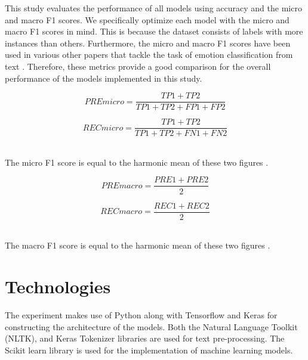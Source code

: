 This study evaluates the performance of all models using accuracy and the micro and macro F1 scores. We specifically optimize each model with the micro and macro F1 scores in mind. This is because the dataset consists of labels with more instances than others. Furthermore, the micro and macro F1 scores have been used in various other papers that tackle the task of emotion classification from text \citep{paperswithcode}. Therefore, these metrics provide a good comparison for the overall performance of the models implemented in this study. 

\begin{equation}
  PREmicro = \frac{TP1 + TP2}{TP1 + TP2 + FP1 + FP2}
\end{equation}

\begin{equation}
  RECmicro = \frac{TP1 + TP2}{TP1 + TP2 + FN1 + FN2}
\end{equation}

\noindent
\\ The micro F1 score is equal to the harmonic mean of these two figures \citep{shams_1970}.

\begin{equation}
  PREmacro = \frac{PRE1 + PRE2}{2}
\end{equation}

\begin{equation}
  RECmacro = \frac{REC1 + REC2}{2}
\end{equation}

\noindent
\\ The macro F1 score is equal to the harmonic mean of these two figures \citep{shams_1970}. 

\section{Technologies}

The experiment makes use of Python along with Tensorflow and Keras for constructing the architecture of the models. Both the Natural Language Toolkit (NLTK), and Keras Tokenizer libraries are used for text pre-processing. The Scikit learn library is used for the implementation of machine learning models. 





  